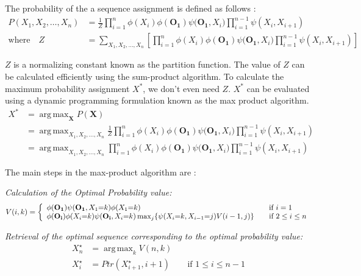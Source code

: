 \documentclass{article}
\DeclareMathOperator*{\argmax}{arg\,max}
\begin{document}
\pagebreak

The probability of the a sequence assignment is defined as follows :
\begin{align*}
P(X_1,X_2,\dotsc,X_n) &= \frac{1}{Z}\prod_{i=1}^{n}{\phi(X_i)\phi(\mathbf{O_1})\psi(\mathbf{O_1},X_i})\prod_{i=1}^{n-1}{\psi(X_i,X_{i+1})} \\
\text{where} \quad Z &= \sum_{X_1,X_2,\dotsc,X_n}\left[{\prod_{i=1}^{n}{\phi(X_i)\phi(\mathbf{O_1})\psi(\mathbf{O_1},X_i})\prod_{i=1}^{n-1}{\psi(X_i,X_{i+1})}}\right]
\end{align*}


$Z$ is a normalizing constant known as the partition function. The value of $Z$ can be calculated efficiently using the sum-product algorithm. To calculate the maximum probability assignment $X^*$, we don't even need $Z$. $X^*$ can be evaluated using a dynamic programming formulation known as the max product algorithm. 
\begin{align*}
X^* &= \argmax_{\mathbf{X}}P(\mathbf{X})\\
 &= \argmax_{X_1,X_2,\dotsc,X_n}\frac{1}{Z}\prod_{i=1}^{n}{\phi(X_i)\phi(\mathbf{O_1})\psi(\mathbf{O_1},X_i})\prod_{i=1}^{n-1}{\psi(X_i,X_{i+1})} \\
 &= \argmax_{X_1,X_2,\dotsc,X_n}\prod_{i=1}^{n}{\phi(X_i)\phi(\mathbf{O_1})\psi(\mathbf{O_1},X_i})\prod_{i=1}^{n-1}{\psi(X_i,X_{i+1})}
\end{align*}

 The main steps in the max-product algorithm are : 

\vspace*{0.2in}

\textit{Calculation of the Optimal Probability value:}
\[
  V(i,k) = \left\{
  \begin{array}{l l}
    \phi(\mathbf{O_1})\psi(\mathbf{O_1},X_1{=}k)\phi(X_1{=}k) & \quad \text{if $i=1$}\\
    \phi(\mathbf{O_i})\phi(X_i{=}k)\psi(\mathbf{O_i},X_i{=}k)\max_{j}\{\psi(X_{i}{=}k,X_{i-1}{=}j)V(i-1,j)\} & \quad \text{if $2\leq i\leq n$}\\
  \end{array} \right.
\]


\textit{Retrieval of the optimal sequence corresponding to the optimal probability value:}
\begin{align*}
X^\star_n &= \argmax_{k}V(n,k) \\
X^\star_{i} &= Ptr(X^\star_{i+1},i+1) & \quad \text{if $1\leq i \leq n-1 $}
\end{align*}
\end{document}
